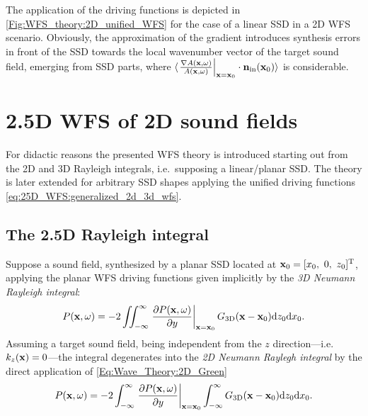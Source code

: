 The application of the driving functions is depicted in \ref{Fig:WFS_theory:2D_unified_WFS} for the case of a linear SSD in a 2D WFS scenario.
Obviously, the approximation of the gradient introduces synthesis errors in front of the SSD towards the local wavenumber vector of the target sound field, emerging from SSD parts, where $\langle \left.
\frac{\nabla A(\mathbf{x},\omega)}{A(\mathbf{x},\omega)} \right|_{\mathbf{x} = \mathbf{x}_0}  \cdot \mathbf{n}_{\mathrm{in}}(\mathbf{x}_0) \rangle$ is considerable.

\section{2.5D WFS of 2D sound fields}
For didactic reasons the presented WFS theory is introduced starting out from the 2D and 3D Rayleigh integrals, i.e.\ supposing a linear/planar SSD.
The theory is later extended for arbitrary SSD shapes applying the unified driving functions \eqref{eq:25D_WFS:generalized_2d_3d_wfs}.

\subsection{The 2.5D Rayleigh integral}
Suppose a sound field, synthesized by a planar SSD located at $\mathbf{x}_0 = [x_0,\ 0,\ z_0]^{\mathrm{T}}$, applying the planar WFS driving functions given implicitly by the \emph{3D Neumann Rayleigh integral}:
\begin{equation}
P(\mathbf{x},\omega) = -2\iint_{-\infty}^{\infty} \left.
\frac{\partial P(\mathbf{x},\omega)}{\partial y} \right|_{\mathbf{x} = \mathbf{x}_0} G_{3\mathrm{D}}(\mathbf{x}-\mathbf{x}_0) \mathrm{d} z_0 \mathrm{d} x_0.
\label{eq:25D_WFS:3D_neumann} 
\end{equation}
Assuming a target sound field, being independent from the $z$ direction---i.e.\ $k_z(\mathbf{x}) = 0$---the integral degenerates into the \emph{2D Neumann Raylegh integral} by the direct application of \eqref{Eq:Wave_Theory:2D_Green}
\begin{equation}
P(\mathbf{x},\omega) = -2\int_{-\infty}^{\infty} \left.
\frac{\partial P(\mathbf{x},\omega)}{\partial y} \right|_{\mathbf{x} = \mathbf{x}_0} \int_{-\infty}^{\infty}  G_{3\mathrm{D}}(\mathbf{x}-\mathbf{x}_0) \mathrm{d} z_0 \mathrm{d} x_0.
\label{eq:25D_WFS:2D_neumann} 
\end{equation}


